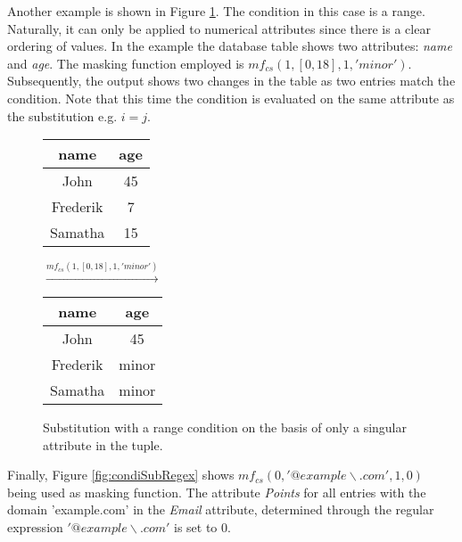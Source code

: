 Another example is shown in Figure \ref{fig:condiSubRange}. The condition in this case is a range. Naturally, it can only be applied to numerical attributes since there is a clear ordering of values. In the example the database table shows two attributes: \textit{name} and \textit{age}. The masking function employed is $mf_{cs}(1,[0, 18], 1, 'minor')$. Subsequently, the output shows two changes in the table as two entries match the condition. Note that this time the condition is evaluated on the same attribute as the substitution e.g. $i = j$. 


\bigskip

\begin{figure}[ht]
    \begin{center}
    \footnotesize{
        \renewcommand{\arraystretch}{1.5}
        \begin{tabular}{|c|c|}
            \hline
            name & age \\
            \hline
            John & 45 \\
            \hline
            Frederik & 7 \\
            \hline
            Samatha & 15 \\
            \hline
        \end{tabular}
        \quad $\xrightarrow{mf_{cs}(1,[0, 18], 1, 'minor')}$ \quad
        \begin{tabular}{|c|c|}
            \hline
            name & age \\
            \hline
            John & 45 \\
            \hline
            Frederik & minor  \\
            \hline
            Samatha & minor \\
            \hline
        \end{tabular}
    }
    \end{center}
    \caption{Substitution with a range condition on the basis of only a singular attribute in the tuple. \label{fig:condiSubRange}}
\end{figure}

Finally, Figure \ref{fig:condiSubRegex} shows $mf_{cs}(0,'@example\backslash.com', 1, 0)$ being used as masking function. The attribute \textit{Points} for all entries with the domain 'example.com' in the \textit{Email} attribute, determined through the regular expression \textit{$'@example\backslash.com'$} is set to 0. 

\bigskip

